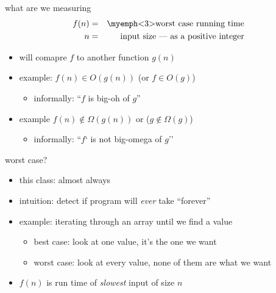 \begin{frame}{what are we measuring}
\begin{eqnarray*}
    f(n) &=& \text{\myemph<3>{worst case} running time} \\
    n    &=& \text{input size --- as a positive integer} \\
\end{eqnarray*}
    \begin{itemize}
        \item<2-> will comapre $f$ to another function $g(n)$
        \item<2-> example: $f(n) \in O(g(n))$ (or $f \in O(g)$)
            \begin{itemize}
                \item informally: ``$f$ is big-oh of $g$''
            \end{itemize}
        \item<2-> example $f(n) \not\in \Omega(g(n))$ or ($g \not\in \Omega(g)$)
            \begin{itemize}
            \item informally: ``$f$` is not big-omega of $g$''
            \end{itemize}
    \end{itemize}
\end{frame}

\begin{frame}{worst case?}
    \begin{itemize}
    \item this class: almost always 
    \item intuition: detect if program will \textit{ever} take ``forever''
    \vspace{.5cm}
    \item<2-> example: iterating through an array until we find a value
        \begin{itemize}
        \item best case: look at one value, it's the one we want
        \item worst case: look at every value, none of them are what we want
        \end{itemize}
    \item<3-> $f(n)$ is run time of \textit{slowest} input of size $n$
    \end{itemize}
\end{frame}
